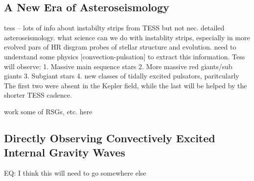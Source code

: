 {\color{blue}
\subsection{A New Era of Asteroseismology}

tess -- lots of info about instabilty strips from TESS but not nec. detailed asteroseismology.  what science can we do with instablity strips, especially in more evolved pars of HR disgram  probes of stellar structure and evolution.   need to understand some physics [convection-pulsation] to extract this information.   Tess will observe: 1. Massive main sequence stars 2. More massive red giants/sub giants 3. Subgiant stars 4.  new classes of tidally excited pulsators, paritcularly The first two were absent in the Kepler field, while the last will be helped by the shorter TESS cadence.

work some of RSGs, etc. here

\subsection{Directly Observing Convectively Excited Internal Gravity Waves}

EQ: I think this will need to go somewhere else



}
